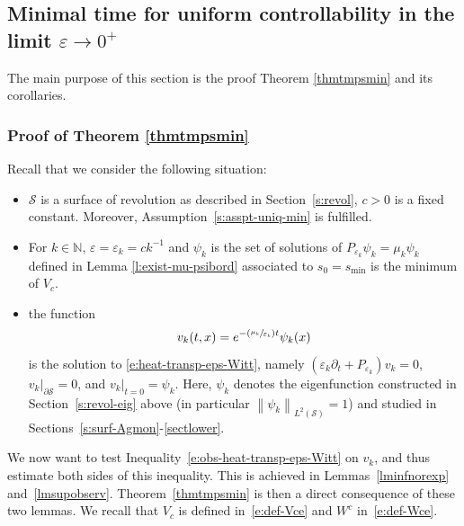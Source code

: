 \documentclass[11pt]{article}
\newcommand{\Subsection}{\subsection}
\numberwithin{equation}{section}
\newcommand{\Psfrac}[2]{(\sfrac{#1}{#2})}
\theoremstyle{definition}
\newcommand{\calS}{\ensuremath{\mathcal S}}
\newcommand{\mb}[1]{\ensuremath{\mathbb{#1}}}
\newcommand{\N}{{\mb{N}}}
\newcommand\nor[2]{\left\|#1\right\|_{#2}}
\newcommand{\ce}{c}
\let\d\partial
\let\e\varepsilon
\let\eps\varepsilon
\begin{document}
\Subsection{Minimal time for uniform controllability in the limit $\eps \to 0^+$}
The main purpose of this section is the proof Theorem \ref{thmtmpsmin} and its corollaries.
\subsubsection{Proof of Theorem \ref{thmtmpsmin}}

Recall that we consider the following situation:
\begin{itemize}
\item $\mathcal{S}$ is a surface of revolution as described in Section~\ref{s:revol}, $\ce>0$ is a fixed constant. Moreover, Assumption~\eqref{s:asspt-uniq-min} is fulfilled.
\item For $k\in \N$, $\e=\e_k=\ce k^{-1}$ and $\psi_k$ is the set of solutions of $P_{\e_k} \psi_k = \mu_k \psi_k$ defined in Lemma \ref{l:exist-mu-psibord} associated to $s_{0}=s_{\min}$ is the minimum of $V_{\ce}$.
\item the function
\begin{equation}
\label{e:def-vk}
v_k(t,x)=e^{-\Psfrac{\mu_k}{\e_{k}} t}\psi_k(x)
\end{equation}
is the solution to \eqref{e:heat-transp-eps-Witt}, namely $(\e_k \d_t + P_{\eps_k})v_k = 0$, $v_k|_{\d\calS}=0$, and $v_k|_{t=0} = \psi_k$. Here, $\psi_k$ denotes the eigenfunction constructed in Section~\ref{s:revol-eig} above (in particular $\nor{\psi_k}{L^2(\calS)}=1$) and studied in Sections~\ref{s:surf-Agmon}-\ref{sectlower}.
\end{itemize}
We now want to test Inequality~\eqref{e:obs-heat-transp-eps-Witt} on $v_k$, and thus estimate both sides of this inequality. This is achieved in Lemmas~\ref{lminfnorexp} and~\ref{lmsupobserv}.
Theorem~\ref{thmtmpsmin} is then a direct consequence of these two lemmas.
We recall that $V_\ce$ is defined in~\eqref{e:def-Vce} and $W^{\ce}$ in~\eqref{e:def-Wce}.
\end{document}
